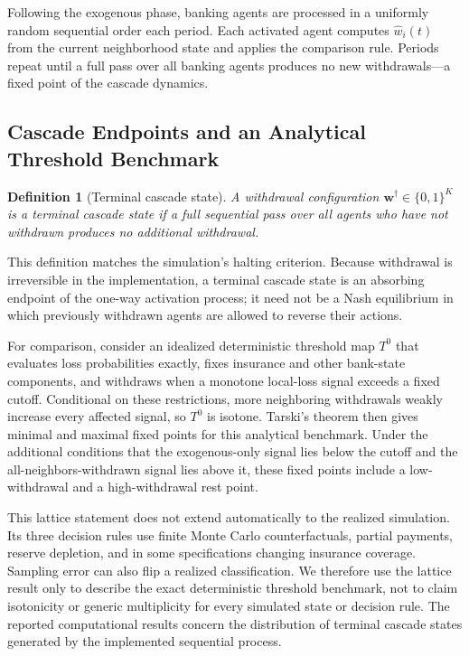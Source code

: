 \documentclass[12pt]{article}\usepackage[]{graphicx}\usepackage[]{xcolor}
\newtheorem{definition}{Definition}
\begin{document}
Following the exogenous phase, banking agents are processed in a uniformly random sequential order each period.
Each activated agent computes $\hat{w}_i(t)$ from the current neighborhood state and applies the comparison rule.
Periods repeat until a full pass over all banking agents produces no new withdrawals---a fixed point of the cascade dynamics.

\subsection{Cascade Endpoints and an Analytical Threshold Benchmark}

\begin{definition}[Terminal cascade state]
\label{def:equilibrium}
A withdrawal configuration $\mathbf{w}^{\dagger}\in\{0,1\}^K$ is a \textit{terminal cascade state} if a full sequential pass over all agents who have not withdrawn produces no additional withdrawal.
\end{definition}

This definition matches the simulation's halting criterion.
Because withdrawal is irreversible in the implementation, a terminal cascade state is an absorbing endpoint of the one-way activation process; it need not be a Nash equilibrium in which previously withdrawn agents are allowed to reverse their actions.

For comparison, consider an idealized deterministic threshold map $T^0$ that evaluates loss probabilities exactly, fixes insurance and other bank-state components, and withdraws when a monotone local-loss signal exceeds a fixed cutoff.
Conditional on these restrictions, more neighboring withdrawals weakly increase every affected signal, so $T^0$ is isotone.
Tarski's theorem then gives minimal and maximal fixed points for this analytical benchmark.
Under the additional conditions that the exogenous-only signal lies below the cutoff and the all-neighbors-withdrawn signal lies above it, these fixed points include a low-withdrawal and a high-withdrawal rest point.

This lattice statement does not extend automatically to the realized simulation.
Its three decision rules use finite Monte Carlo counterfactuals, partial payments, reserve depletion, and in some specifications changing insurance coverage.
Sampling error can also flip a realized classification.
We therefore use the lattice result only to describe the exact deterministic threshold benchmark, not to claim isotonicity or generic multiplicity for every simulated state or decision rule.
The reported computational results concern the distribution of terminal cascade states generated by the implemented sequential process.
\end{document}
